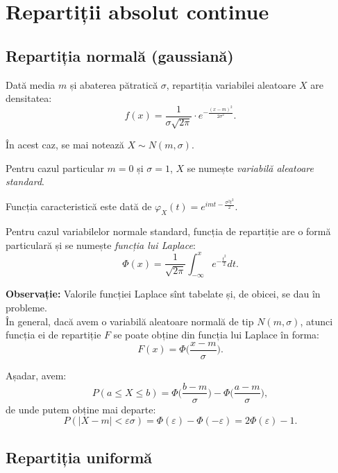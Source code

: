 
\section{Repartiții absolut continue}

\subsection{Repartiția normală (gaussiană)}

\indent\indent Dată media $ m $ și abaterea pătratică $ \sigma $, repartiția
variabilei aleatoare $ X $ are densitatea:
\[
  f(x) = \frac{1}{\sigma \sqrt{2\pi}} \cdot e^{-\frac{(x - m)^2}{2\sigma^2}}.
\]

În acest caz, se mai notează $ X \sim N(m, \sigma) $.

Pentru cazul particular $ m = 0 $ și $ \sigma = 1 $, $ X $ se numește
\emph{variabilă aleatoare standard}.

Funcția caracteristică este dată de $ \varphi_X(t) = e^{imt - \frac{\sigma^2 t^2}{2}}. $

Pentru cazul variabilelor normale standard, funcția de repartiție are o formă
particulară și se numește \emph{funcția lui Laplace}:
\[
  \Phi(x) = \frac{1}{\sqrt{2\pi}} \int_{-\infty}^x e^{-\frac{t^2}{2}} dt.
\]

\textbf{Observație:} Valorile funcției Laplace sînt tabelate și, de obicei,
se dau în probleme. \\

În general, dacă avem o variabilă aleatoare normală de tip $ N(m, \sigma) $, atunci
funcția ei de repartiție $ F $ se poate obține din funcția lui Laplace în forma:
\[
  F(x) = \Phi \Big( \frac{x - m}{\sigma} \Big).
\]

Așadar, avem:
\begin{equation}
  \label{eq:p-phi-lap}
  P(a \leq X \leq b) = \Phi \Big( \frac{b - m}{\sigma} \Big) - \Phi \Big( \frac{a - m}{\sigma} \Big),
\end{equation}
de unde putem obține mai departe:
\[
  P(|X - m| < \varepsilon \sigma) = \Phi(\varepsilon) - \Phi(-\varepsilon) = %
  2 \Phi(\varepsilon) - 1.
\]



\subsection{Repartiția uniformă}


